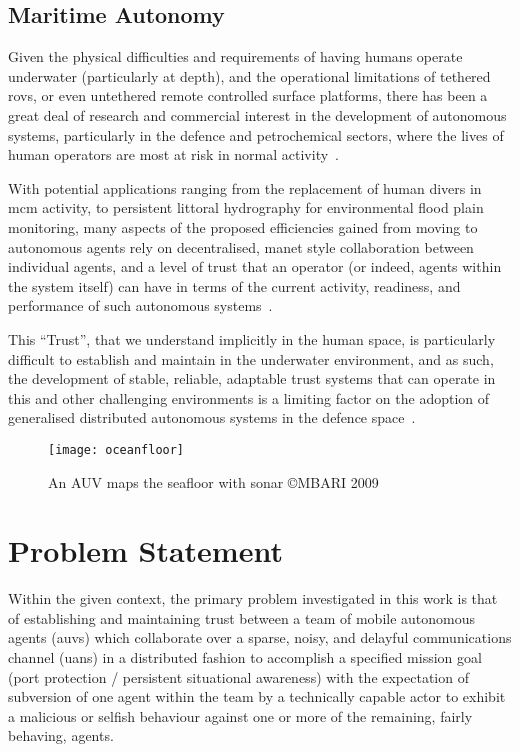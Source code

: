 \subsection{Maritime Autonomy}

Given the physical difficulties and requirements of having humans operate underwater (particularly at depth), and the operational limitations of tethered \glspl{rov}, or even untethered remote controlled surface platforms, there has been a great deal of research and commercial interest in the development of autonomous systems, particularly in the defence and petrochemical sectors, where the lives of human operators are most at risk in normal activity~\cite{Pechoucek:2008:DIA:1355335}.

With potential applications ranging from the replacement of human divers in \gls{mcm} activity, to persistent littoral hydrography for environmental flood plain monitoring, many aspects of the proposed efficiencies gained from moving to autonomous agents rely on decentralised, \gls{manet} style collaboration between individual agents, and a level of trust that an operator (or indeed, agents within the system itself) can have in terms of the current activity, readiness, and performance of such autonomous systems~\cite{Wynn2014}.

This ``Trust'', that we understand implicitly in the human space, is particularly difficult to establish and maintain in the underwater environment, and as such, the development of stable, reliable, adaptable trust systems that can operate in this and other challenging environments is a limiting factor on the adoption of generalised distributed autonomous systems in the defence space~\cite{Caseley2009}.

\begin{figure}[h]
	\centering
	\texttt{[image: oceanfloor]}
	\caption{An AUV maps the seafloor with sonar \copyright MBARI 2009}
\end{figure}

\pagebreak
\section{Problem Statement}\label{sec:problem}

Within the given context, the primary problem investigated in this work is that of establishing and maintaining trust between a team of mobile autonomous agents (\glspl{auv}) which collaborate over a sparse, noisy, and delayful communications channel (\glspl{uan}) in a distributed fashion to accomplish a specified mission goal (port protection / persistent situational awareness) with the expectation of subversion of one agent within the team by a technically capable actor to exhibit a malicious or selfish behaviour against one or more of the remaining, fairly behaving, agents. 

